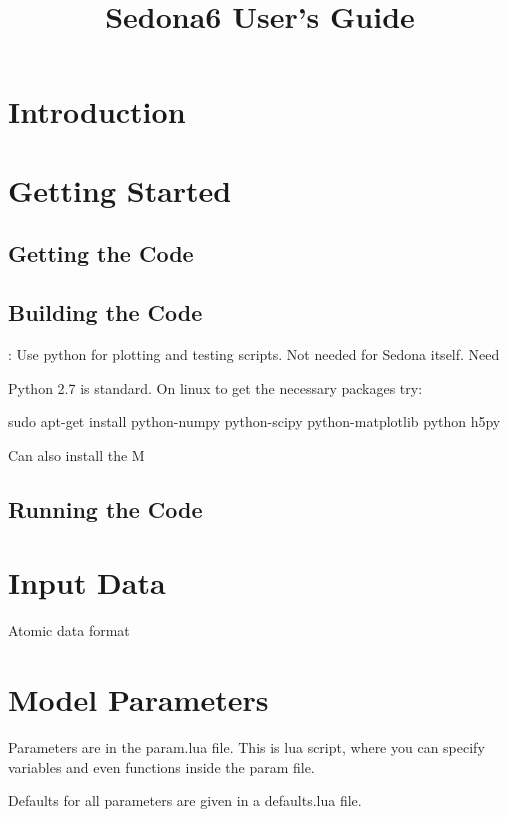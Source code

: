 \documentclass[11pt,letterpaper]{article}
\begin{document}
\title{Sedona6 User's Guide}
\maketitle

\section{Introduction}

\section{Getting Started}

\subsection{Getting the Code}

\subsection{Building the Code}


: Use python for plotting and testing scripts. Not needed for Sedona itself. Need

Python 2.7 is standard. On linux to get the necessary packages try:

sudo apt-get install python-numpy python-scipy python-matplotlib python h5py

Can also install the M


\subsection{Running the Code}




\section{Input Data}

Atomic data format

\section{Model Parameters}

Parameters are in the param.lua file. This is lua script, where you can specify variables and even functions inside the param file.

Defaults for all parameters are given in a defaults.lua file. 
\end{document}
